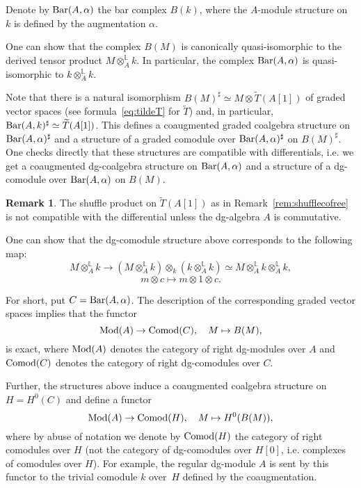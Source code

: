 \documentclass[10pt,russian]{article}
\theoremstyle{plain}
\theoremstyle{definition}
\newtheorem{rem}[theorem]{Remark}
\newcommand{\Barr}{{\rm Bar}}
\newcommand{\Mod}{{\rm Mod}}
\newcommand{\Comod}{{\rm Comod}}
\begin{document}
Denote by $\Barr(A, \alpha)$ the bar complex $B(k)$, where the $A$-module structure on~$k$ is defined by the augmentation $\alpha$.

One can show that the complex $B(M)$ is canonically quasi-isomorphic to the derived tensor product $M \otimes_A^{\mathbb L} k$. In particular, the complex $\Barr(A, \alpha)$ is quasi-isomorphic to $k \otimes^{\mathbb L}_A k$.

Note that there is a natural isomorphism $B(M)^{\sharp}\simeq M \otimes \widetilde{T}(A[1])$ of graded vector spaces (see formula~\eqref{eq:tildeT} for $\widetilde{T}$) and, in particular, $\Barr(A,k)^{\sharp}\simeq\widetilde{T}(A[1])$. This defines a coaugmented graded coalgebra structure on $\Barr(A, \alpha)^{\sharp}$ and a structure of a graded comodule over $\Barr(A, \alpha)^{\sharp}$ on $B(M)^{\sharp}$. One checks directly that these structures are compatible with differentials, i.e. we get a coaugmented dg-coalgebra structure on $\Barr(A, \alpha)$ and a structure of a  dg-comodule over $\Barr(A, \alpha)$ on $B(M)$.

\begin{rem}
The shuffle product on $\widetilde{T}(A[1])$ as in Remark~\ref{rem:shufflecofree} is not compatible with the differential unless the dg-algebra $A$ is commutative.
\end{rem}

One can show that the dg-comodule structure above corresponds to the following map:
$$
M\otimes^{\mathbb L}_A k \to (M\otimes^{\mathbb L}_A k) \otimes_k (k \otimes^{\mathbb L}_A k) \simeq M \otimes^{\mathbb L}_A k \otimes^{\mathbb L}_A k,
$$
$$
m \otimes c \mapsto m \otimes 1 \otimes c.
$$


For short, put $C=\Barr(A,\alpha)$. The description of the corresponding graded vector spaces implies that the functor
$$
\Mod(A)\to \Comod(C),\quad M\mapsto B(M),
$$
is exact, where $\Mod(A)$ denotes the category of right dg-modules over $A$ and $\Comod(C)$ denotes the category of right dg-comodules over $C$.

\medskip

Further, the structures above induce a coaugmented coalgebra structure on $H = H^0(C)$ and define a functor
$$
\Mod(A) \to  \Comod(H),\quad M \mapsto  H^0(B(M)),
$$
where by abuse of notation we denote by $\Comod(H)$ the category of right comodules over $H$ (not the category of dg-comodules over $H[0]$, i.e. complexes of comodules over $H$). For example, the regular dg-module $A$ is sent by this functor to the trivial comodule $k$ over~$H$ defined by the coaugmentation.
\end{document}
